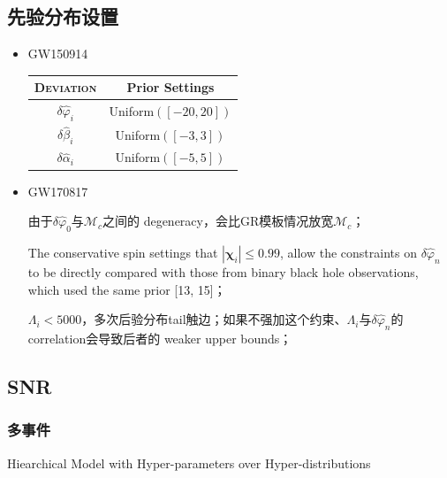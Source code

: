\documentclass[CJK]{paper}  %
\begin{document}
\subsection{先验分布设置}
\begin{itemize}
	\item[1. ] GW150914\cite{test_GR_GW150914}
	\begin{table}[h!]
		\begin{center}
			\begin{tabular}{|c|c|}
				\hline
				\textsc{Deviation} & Prior Settings \\
				\hline
				$\delta \hat{\varphi}_i$ & Uniform$([-20,20])$ \\
				\hline
				$\delta \hat{\beta}_i$ & Uniform$([-3,3])$ \\
				\hline
				$\delta \hat{\alpha}_i$ & Uniform$([-5,5])$ \\
				\hline
			\end{tabular}
		\end{center}
	\end{table}
	\item[2. ] GW170817\cite{test_GR_GW170817}
		\par 由于$\delta\hat{\varphi}_0$与$\mathcal{M}_c$之间的 degeneracy，会比GR模板情况放宽$\mathcal{M}_c$；
		\par The conservative spin settings that $|\mathbf{\chi}_i| \leq 0.99$,
			allow the constraints on $\delta\hat{\varphi}_n$ to be directly compared with those from binary black hole observations,
			which used the same prior [13, 15]；
		\par $\Lambda_i < 5000$，多次后验分布tail触边；如果不强加这个约束、$\Lambda_i$与$\delta\hat{\varphi}_n$的correlation会导致后者的 weaker upper bounds；
\end{itemize}

\subsection{SNR}

\subsubsection{多事件}
\par \cite{combined_pi}\cite{combined_theory}\cite{combined_hierarchical}
\par Hiearchical Model with Hyper-parameters over Hyper-distributions 
\end{document}
